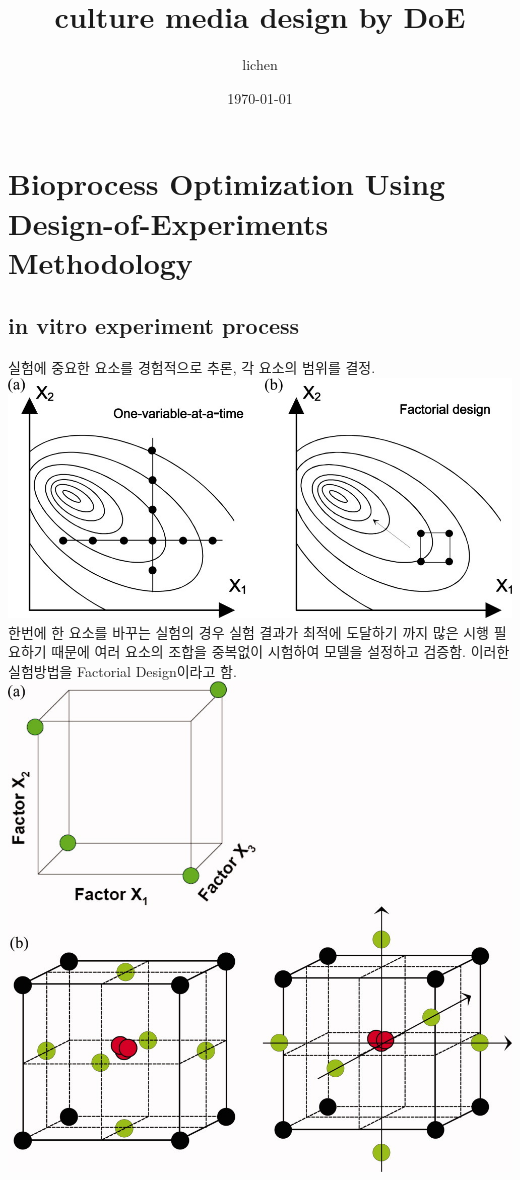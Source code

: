 \documentclass{article}
\author{lichen}
\date{\today}
\title{culture media design by DoE}
\begin{document}
\begin{titlepage}
    \maketitle
\end{titlepage}

\section{Bioprocess Optimization Using Design-of-Experiments Methodology\cite{mandenius2008bioprocess}}

\subsection{in vitro experiment process}
실험에 중요한 요소를 경험적으로 추론, 각 요소의 범위를 결정.\\
\includegraphics[scale=0.3]{surface.jpg}\\
한번에 한 요소를 바꾸는 실험의 경우 실험 결과가 최적에 도달하기 까지 많은 시행 필요하기 때문에 여러 요소의 조합을 중복없이 시험하여 모델을 설정하고 검증함. 이러한 실험방법을 Factorial Design이라고 함.\\
\includegraphics[scale=0.2]{fatorial design.jpg}\\
\end{document}

